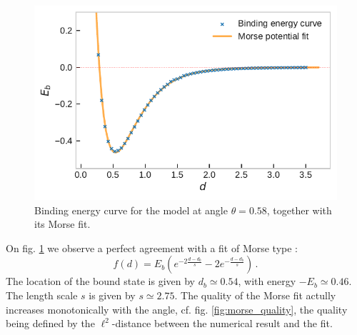 \documentclass[reprint, amsmath, amssymb, floatfix, aps, pra]{revtex4-2}
\begin{document}
    \begin{figure}
        \includegraphics[scale=0.74]{figures/binding.pdf}
        \caption{\label{fig:binding}Binding energy curve for the model at angle $\theta=0.58$, together with its Morse fit.}
    \end{figure}

    On fig. \ref{fig:binding} we observe a perfect agreement with a fit of Morse type \cite{herzberg1950spectra, apanavicius2021morse, le2006accurate, roy2007new, chiumorse2010}:
    \begin{equation}
    \label{eq:morse_fit}
        f(d) = E_b\left(e^{-2\frac{d-d_b}{s}} - 2e^{-\frac{d-d_b}{s}}\right)\,.
    \end{equation}
    The location of the bound state is given by $d_b\simeq 0.54$, with energy $-E_b\simeq 0.46$. The length scale $s$ is given by $s\simeq 2.75$. The quality of the Morse fit actully increases monotonically with the angle, cf. fig. \ref{fig:morse_quality}, the quality being defined by the $\ell^2$-distance between the numerical result and the fit.
\end{document}
